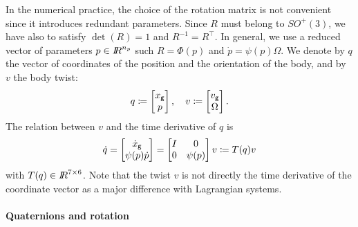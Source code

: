 In the numerical practice, the choice of the rotation matrix is not convenient since it introduces redundant parameters. Since $R$ must belong to $SO^+(3)$, we have also to satisfy $\det(R)=1$ and $R^{-1}=R^\top$. In general, we use a reduced vector of parameters $p\in\mbox{\rm $I\!\!R$}^{n_p}$ such $R = \Phi(p)$ and $\dot p = \psi(p)\Omega $. We denote  by $q$ the vector of coordinates of the position and the orientation of the body, and by $v$ {the body twist}:
\begin{equation}
  q \coloneqq \begin{bmatrix}
    x_{\sf \small g}\\
    p
  \end{bmatrix},\quad 
  v \coloneqq \begin{bmatrix}
     v_{\sf \small g}\\
     \Omega
   \end{bmatrix}.
 \end{equation}
 The relation between $v$ and the time derivative of $q$ is
\begin{equation}
  \label{eq:TT}
  \dot q = 
  \begin{bmatrix}
     \dot x_{\sf \small g}\\
     \psi(p) \dot p
   \end{bmatrix}
   = 
   \begin{bmatrix}
     I & 0 \\
     0 & \psi(p)
   \end{bmatrix}
   v
   \coloneqq
   T(q) v
\end{equation}
with $T(q) \in \mbox{\rm $I\!\!R$}^{7\times 6}$.
{Note that the twist $v$ is not directly the time derivative of the coordinate vector as a major difference with Lagrangian systems. }

\paragraph{Quaternions and rotation} 

